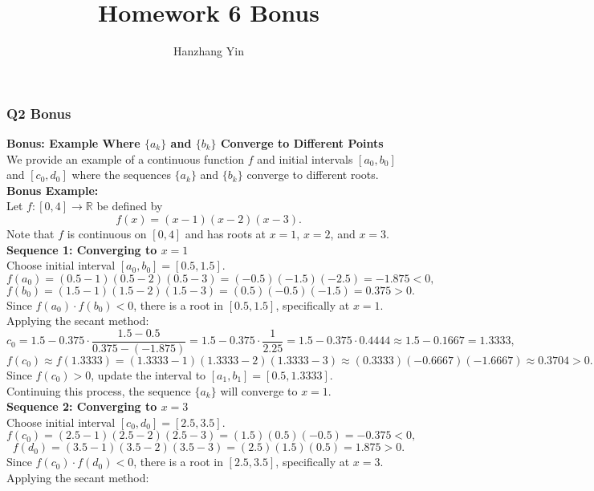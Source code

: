 \documentclass{article}
\title{\vspace{-4em}Homework 6 Bonus}
\author{Hanzhang Yin}
\begin{document}
\maketitle

\subsubsection*{Q2 Bonus}

\textbf{Bonus: Example Where \( \{ a_k \} \) and \( \{ b_k \} \) Converge to Different Points}
\\
We provide an example of a continuous function \( f \) and initial intervals \( [a_0, b_0] \) and \( [c_0, d_0] \) where the sequences \( \{ a_k \} \) and \( \{ b_k \} \) converge to different roots.
\\
\textbf{Bonus Example:}
\\
Let \( f: [0, 4] \to \mathbb{R} \) be defined by
\[
    f(x) = (x - 1)(x - 2)(x - 3).
\]
Note that \( f \) is continuous on \([0, 4]\) and has roots at \( x = 1 \), \( x = 2 \), and \( x = 3 \).
\\
\textbf{Sequence 1: Converging to \( x = 1 \)}
\\
Choose initial interval \( [a_0, b_0] = [0.5, 1.5] \).
\[
    f(a_0) = (0.5 - 1)(0.5 - 2)(0.5 - 3) = (-0.5)(-1.5)(-2.5) = -1.875 < 0,
\]
\[
    f(b_0) = (1.5 - 1)(1.5 - 2)(1.5 - 3) = (0.5)(-0.5)(-1.5) = 0.375 > 0.
\]
Since \( f(a_0) \cdot f(b_0) < 0 \), there is a root in \( [0.5, 1.5] \), specifically at \( x = 1 \).
\\
Applying the secant method:
\[
    c_0 = 1.5 - 0.375 \cdot \frac{1.5 - 0.5}{0.375 - (-1.875)} = 1.5 - 0.375 \cdot \frac{1}{2.25} = 1.5 - 0.375 \cdot 0.4444 \approx 1.5 - 0.1667 = 1.3333,
\]
\[
    f(c_0) \approx f(1.3333) = (1.3333 - 1)(1.3333 - 2)(1.3333 - 3) \approx (0.3333)(-0.6667)(-1.6667) \approx 0.3704 > 0.
\]
Since \( f(c_0) > 0 \), update the interval to \( [a_1, b_1] = [0.5, 1.3333] \).
\\
Continuing this process, the sequence \( \{ a_k \} \) will converge to \( x = 1 \).
\\
\textbf{Sequence 2: Converging to \( x = 3 \)}
\\
Choose initial interval \( [c_0, d_0] = [2.5, 3.5] \).
\[
    f(c_0) = (2.5 - 1)(2.5 - 2)(2.5 - 3) = (1.5)(0.5)(-0.5) = -0.375 < 0,
\]
\[
    f(d_0) = (3.5 - 1)(3.5 - 2)(3.5 - 3) = (2.5)(1.5)(0.5) = 1.875 > 0.
\]
Since \( f(c_0) \cdot f(d_0) < 0 \), there is a root in \( [2.5, 3.5] \), specifically at \( x = 3 \).
\\
Applying the secant method:
\end{document}
